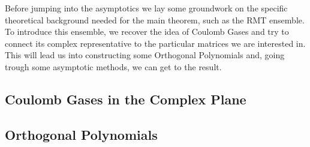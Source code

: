 Before jumping into the asymptotics we lay some groundwork on the specific theoretical background needed for the main theorem, such as the RMT ensemble. To introduce this ensemble, we recover the idea of Coulomb Gases and try to connect its complex representative to the particular matrices we are interested in. This will lead us into constructing some Orthogonal Polynomials and, going trough some asymptotic methods, we can get to the result.

\subsection{Coulomb Gases in the Complex Plane}



\subsection{Orthogonal Polynomials}


